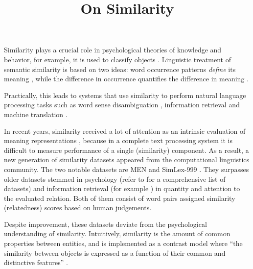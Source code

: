 \documentclass[11pt]{article}
\title{On Similarity}
\date{}
\begin{document}
\maketitle



Similarity plays a crucial role in psychological theories of knowledge and behavior, for example, it is used to classify objects \cite{Tversky1977}.
%
Linguistic treatment of semantic similarity is based on two ideas: word occurrence patterns \emph{define} its meaning \cite{firth1957lingtheory}, while the difference in occurrence \textup{quantifies} the difference in meaning \cite{harris1954distributional}.

Practically, this leads to systems that use similarity to perform natural language processing tasks such as word sense disambiguation \cite{Schutze:1998:AWS:972719.972724}, information retrieval \cite{Salton:1975:VSM:361219.361220} and machine translation \cite{Dagan:1993:CWS:981574.981596}.

In recent years, similarity received a lot of attention as an intrinsic evaluation of meaning representations \cite{mikolov2013efficient,Bruni:2012:DST:2390524.2390544}, because in a complete text processing system it is difficult to measure performance of a single (similarity) component. As a result, a new generation of similarity datasets appeared from the computational linguistics community. The two notable datasets are MEN \cite{Bruni:2012:DST:2390524.2390544} and SimLex-999 \cite{hill2014simlex}. They surpasses older datasets stemmed in psychology (refer to  for a comprehensive list of datasets) and information retrieval (for example ) in quantity and attention to the evaluated relation. Both of them consist of word pairs assigned similarity (relatedness) scores based on human judgements.

Despite improvement, these datasets deviate from the psychological understanding of similarity. Intuitively, similarity is the amount of common properties between entities, and is implemented as a contrast model where ``the similarity between objects is expressed as a function of their common and distinctive features'' \cite{Tversky1977}.
\end{document}
